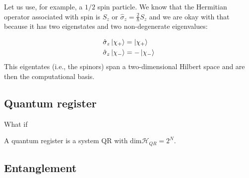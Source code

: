 Let us use, for example, a $1/2$ spin particle.   We know that the Hermitian operator associated with spin is $S_z$ or $\hat{\sigma}_z = \frac{2}{\hbar} S_z$ and we are okay with that because it has two eigenstates and two non-degenerate eigenvalues: 

\begin{align*}
    &\hat{\sigma}_z \ket{\chi_+} = \ket{\chi_+}  \\
    &\hat{\sigma}_z \ket{\chi_-} = -\ket{\chi_-}
\end{align*}
This eigentates (i.e., the spinors) span a two-dimensional Hilbert space and are then the computational basis.
\subsection{Quantum register}
What if 
\begin{defn}
A quantum register is a system QR  with $\text{dim}\mathcal{H}_{QR} = 2^N$.
\end{defn}
\subsection{Entanglement}